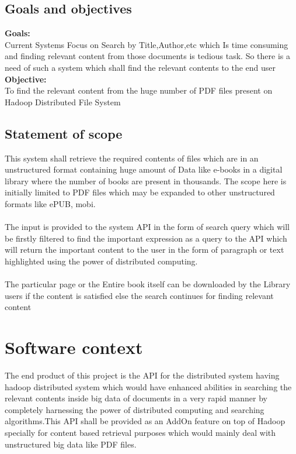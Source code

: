 \documentclass[oneside,a4paper,12pt]{report}
\begin{document}
\subsection{Goals and objectives}  
\noindent \textbf{Goals:} \\
Current Systems Focus on Search by Title,Author,etc which Is time consuming and finding relevant content from those documents is tedious task. So there is a need of such a system which shall find the relevant contents to the end user \\

\noindent \textbf{Objective:} \\
To find the relevant content from the huge number of PDF files present on Hadoop Distributed File System \\


 \subsection{Statement of scope} 
This system shall retrieve the required contents of files which are in an unstructured format containing huge amount of Data like e-books in a digital library where the number of books are present in thousands. The scope here is initially limited to PDF files which may be expanded to other unstructured formats like ePUB, mobi.  \\ \\
The input is provided to the system API in the form of search query which will be firstly filtered to find the important expression as a query to the API which will return the important content to the user in the form of paragraph or text highlighted using the power of distributed computing. \\ \\
The particular page or the Entire book itself can be downloaded by the Library users if the content is satisfied else the search continues for finding relevant content 

\section{Software context} 
The end product of this project is the API for the distributed system having hadoop distributed system which would have enhanced abilities in searching the relevant contents inside big data of documents in a very rapid manner by completely harnessing the power of distributed computing and searching algorithms.This API shall be provided as an AddOn feature on top of Hadoop specially for content based retrieval purposes which would mainly deal with unstructured big data like PDF files.
\end{document}

